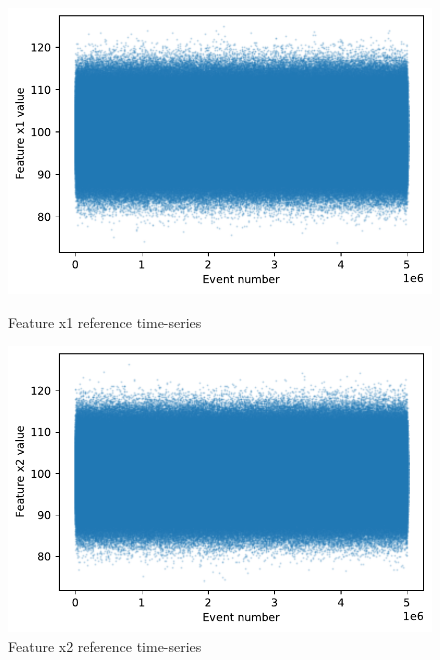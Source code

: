 \begin{figure}[!htb] 
  \begin{minipage}[b]{0.5\linewidth}
    \centering
    \includegraphics[width=1\linewidth]{figures/timeseries-r6-x1.pdf} 
    \caption{Feature x1 reference time-series} 
    \label{fig:timeseries-r6-x1} 
    \vspace{4ex}
  \end{minipage}%
  \begin{minipage}[b]{0.5\linewidth}
    \centering
    \includegraphics[width=1\linewidth]{figures/timeseries-r6-x2.pdf} 
    \caption{Feature x2 reference time-series} 
    \label{fig:timeseries-r6-x2} 
    \vspace{4ex}
  \end{minipage} 
  \begin{minipage}[b]{0.5\linewidth}
    \centering

\end{minipage}
\end{figure}
